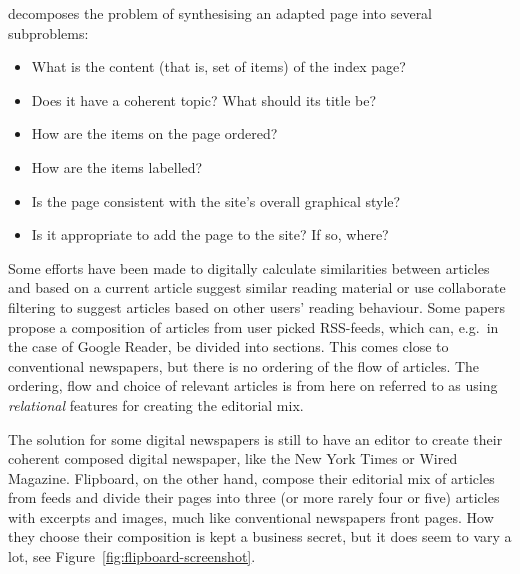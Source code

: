 \cite{perkowitz-Adaptive-Web-Sites} decomposes the problem of synthesising an adapted page into several subproblems:
\begin{itemize}\itemdist
	\item What is the content (that is, set of items) of the index page?
	\item Does it have a coherent topic? What should its title be?
	\item How are the items on the page ordered?
	\item How are the items labelled?
	\item Is the page consistent with the site's overall graphical style?
	\item Is it appropriate to add the page to the site? If so, where?
\end{itemize}

Some efforts have been made to digitally calculate similarities between articles and based on a current article suggest similar reading material or use collaborate filtering to suggest articles based on other users' reading behaviour. Some papers propose a composition of articles from user picked RSS-feeds, which can, e.g.\ in the case of Google Reader, be divided into sections. This comes close to conventional newspapers, but there is no ordering of the flow of articles. The ordering, flow and choice of relevant articles is from here on referred to as using \emph{relational} features for creating the editorial mix.

The solution for some digital newspapers is still to have an editor to create their coherent composed digital newspaper, like the New York Times or Wired Magazine. Flipboard, on the other hand, compose their editorial mix of articles from feeds and divide their pages into three (or more rarely four or five) articles with excerpts and images, much like conventional newspapers front pages. How they choose their composition is kept a business secret, but it does seem to vary a lot, see Figure~\ref{fig:flipboard-screenshot}.

